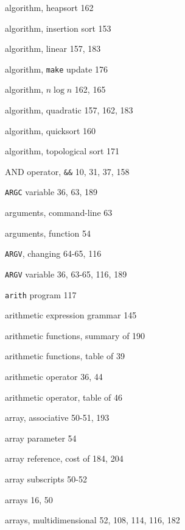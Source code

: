 \begin{multicols}{3}
\hangindent=3pc  algorithm, heapsort 162

\hangindent=3pc  algorithm, insertion sort 153

\hangindent=3pc  algorithm, linear 157, 183

\hangindent=3pc  algorithm, \verb'make' update 176

\hangindent=3pc  algorithm, $n\log n$ 162, 165

\hangindent=3pc  algorithm, quadratic 157, 162, 183

\hangindent=3pc  algorithm, quicksort 160

\hangindent=3pc  algorithm, topological sort 171

\hangindent=3pc  AND operator, \verb'&&' 10, 31, 37, 158

\hangindent=3pc  \verb'ARGC' variable 36, 63, 189

\hangindent=3pc  arguments, command-line 63

\hangindent=3pc  arguments, function 54

\hangindent=3pc  \verb'ARGV', changing 64-65, 116

\hangindent=3pc  \verb'ARGV' variable 36, 63-65, 116, 189

\hangindent=3pc  \verb'arith' program 117

\hangindent=3pc  arithmetic expression grammar 145

\hangindent=3pc  arithmetic functions, summary of 190

\hangindent=3pc  arithmetic functions, table of 39

\hangindent=3pc  arithmetic operator 36, 44

\hangindent=3pc  arithmetic operator, table of 46

\hangindent=3pc  array, associative 50-51, 193

\hangindent=3pc  array parameter 54

\hangindent=3pc  array reference, cost of 184, 204

\hangindent=3pc  array subscripts 50-52

\hangindent=3pc  arrays 16, 50

\hangindent=3pc  arrays, multidimensional 52, 108, 114, 116, 182


\end{multicols}
